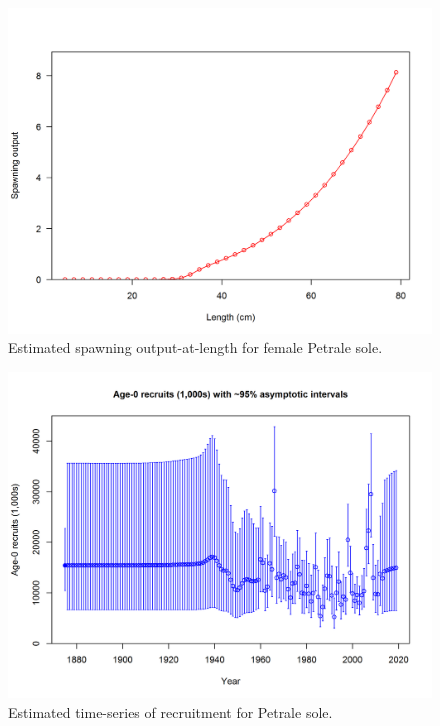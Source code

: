 \documentclass[12pt,]{article}
\begin{document}
\begin{figure}
\centering
\includegraphics{r4ss/plots_mod1/bio10_spawningoutput_len.png}
\caption{Estimated spawning output-at-length for female Petrale sole.
\label{fig:spawnoutlen}}
\end{figure}

\FloatBarrier 

\begin{figure}
\centering
\includegraphics{r4ss/plots_mod1/ts11_Age-0_recruits_(1000s)_with_95_asymptotic_intervals.png}
\caption{Estimated time-series of recruitment for Petrale sole.
\label{fig:recruits}}
\end{figure}
\end{document}
